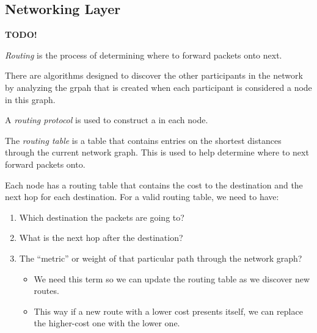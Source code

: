 \subsection{Networking Layer}\label{subsec:Networking_Layer}
\begin{definition}\label{def:Networking_Layer}
  \textbf{TODO!}
\end{definition}

\begin{definition}[Routing]\label{def:Routing}
  \emph{Routing} is the process of determining where to forward packets onto next.

  There are algorithms designed to discover the other participants in the network by analyzing the grpah that is created when each participant is considered a node in this graph.
\end{definition}

\begin{definition}\label{def:Routing_Protocol}
  A \emph{routing protocol} is used to construct a  in each node.
\end{definition}

\begin{definition}\label{def:Routing_Table}
  The \emph{routing table} is a table that contains entries on the shortest distances through the current network graph.
  This is used to help determine where to next forward packets onto.

  Each node has a routing table that contains the cost to the destination and the next hop for each destination.
  For a valid routing table, we need to have:
  \begin{enumerate}[noitemsep]
  \item Which destination the packets are going to?
  \item What is the next hop after the destination?
  \item The ``metric'' or weight of that particular path through the network graph?
    \begin{itemize}[noitemsep]
    \item We need this term so we can update the routing table as we discover new routes.
    \item This way if a new route with a lower cost presents itself, we can replace the higher-cost one with the lower one.
    \end{itemize}
  \end{enumerate}
\end{definition}

